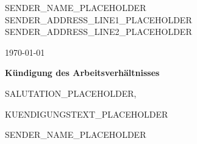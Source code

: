 \documentclass[a4paper,12pt]{article}
\begin{document}
\vspace*{-1cm}
\noindent
SENDER_NAME_PLACEHOLDER \\
SENDER_ADDRESS_LINE1_PLACEHOLDER \\
SENDER_ADDRESS_LINE2_PLACEHOLDER

\vspace{1cm}

\hfill \today

\vspace{2cm}

\textbf{Kündigung des Arbeitsverhältnisses}

\vspace{1cm}

SALUTATION_PLACEHOLDER,

\vspace{0.5cm}
KUENDIGUNGSTEXT_PLACEHOLDER

\vspace{1.5cm}

SENDER_NAME_PLACEHOLDER
\end{document}
